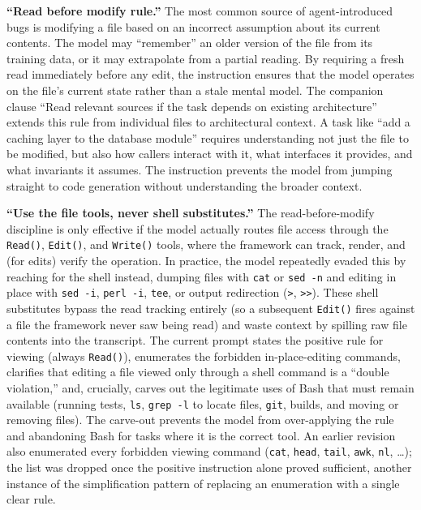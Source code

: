 \documentclass{article}
\begin{document}
\textbf{``Read before modify rule.''}  The most common source of agent-introduced bugs is modifying a file based on an incorrect assumption about its current contents.  The model may ``remember'' an older version of the file from its training data, or it may extrapolate from a partial reading.  By requiring a fresh read immediately before any edit, the instruction ensures that the model operates on the file's current state rather than a stale mental model.  The companion clause ``Read relevant sources if the task depends on existing architecture'' extends this rule from individual files to architectural context.  A task like ``add a caching layer to the database module'' requires understanding not just the file to be modified, but also how callers interact with it, what interfaces it provides, and what invariants it assumes.  The instruction prevents the model from jumping straight to code generation without understanding the broader context.

\textbf{``Use the file tools, never shell substitutes.''}  The read-before-modify discipline is only effective if the model actually routes file access through the \texttt{Read()}, \texttt{Edit()}, and \texttt{Write()} tools, where the framework can track, render, and (for edits) verify the operation.  In practice, the model repeatedly evaded this by reaching for the shell instead, dumping files with \texttt{cat} or \texttt{sed -n} and editing in place with \texttt{sed -i}, \texttt{perl -i}, \texttt{tee}, or output redirection (\texttt{>}, \texttt{>>}).  These shell substitutes bypass the read tracking entirely (so a subsequent \texttt{Edit()} fires against a file the framework never saw being read) and waste context by spilling raw file contents into the transcript.  The current prompt states the positive rule for viewing (always \texttt{Read()}), enumerates the forbidden in-place-editing commands, clarifies that editing a file viewed only through a shell command is a ``double violation,'' and, crucially, carves out the legitimate uses of Bash that must remain available (running tests, \texttt{ls}, \texttt{grep -l} to locate files, \texttt{git}, builds, and moving or removing files).  The carve-out prevents the model from over-applying the rule and abandoning Bash for tasks where it is the correct tool.  An earlier revision also enumerated every forbidden viewing command (\texttt{cat}, \texttt{head}, \texttt{tail}, \texttt{awk}, \texttt{nl}, \ldots); the list was dropped once the positive instruction alone proved sufficient, another instance of the simplification pattern of replacing an enumeration with a single clear rule.
\end{document}

